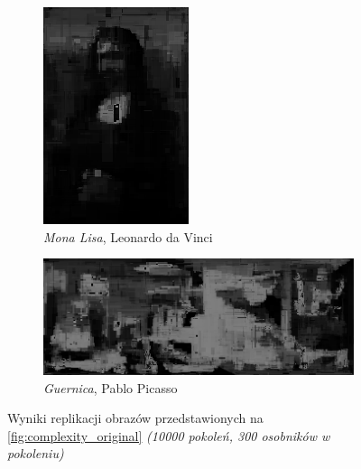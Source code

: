 \begin{figure}[!htb]
\begin{subfigure}[b]{0.3\textwidth}
         \includegraphics[width=\textwidth]{images/complexity/mona.png}
         \caption{\textit{Mona Lisa}, Leonardo da Vinci}
    \end{subfigure}
    \begin{subfigure}[b]{0.8\textwidth}
        \centering
        \label{fig:complexity_guernica_rep}
         \includegraphics[width=\textwidth]{images/complexity/guernica.png}
         \caption{\textit{Guernica}, Pablo Picasso}
    \end{subfigure}
    \caption{Wyniki replikacji obrazów przedstawionych na \ref{fig:complexity_original} \textit{(10000 pokoleń, 300 osobników w pokoleniu)}}
    \label{fig:complexity_rep}
\end{figure}

